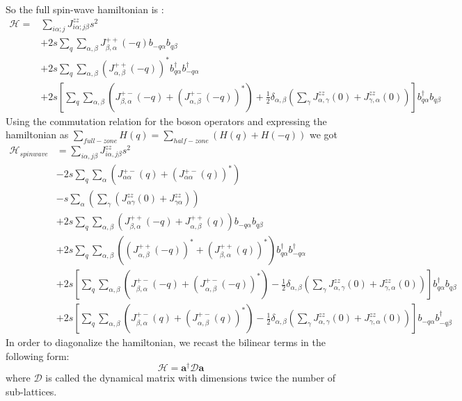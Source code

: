 So the full spin-wave hamiltonian is :
\begin{equation}\label{eq45}
\begin{split}
\mathcal{H} = &\sum_{i\alpha;j}^{}J^{zz}_{i\alpha;j\beta}s^2\\
&+2s\sum_{q}^{}\sum_{\alpha,\beta}^{}J^{++}_{\beta,\alpha}(-q)b_{-q\alpha}b_{q\beta}\\
&+2s\sum_{q}^{}\sum_{\alpha,\beta}^{}(J_{\alpha,\beta}^{++}(-q))^*b^\dagger_{q\alpha}b^\dagger_{-q\alpha}\\
&+2s[\sum_{q}^{}\sum_{\alpha,\beta}^{}(J^{+-}_{\beta,\alpha}(-q) + (J^{+-}_{\alpha,\beta}(-q))^*) + \frac{1}{2}\delta_{\alpha,\beta}(\sum_{\gamma}^{}J^{zz}_{\alpha,\gamma}(0) + J^{zz}_{\gamma,\alpha}(0)) ]b^\dagger_{q\alpha}b_{q\beta}
\end{split}
\end{equation}
Using the commutation relation for the boson operators and expressing the hamiltonian as $ \sum_{full-zone}^{}H(q) = \sum_{half-zone}^{}(H(q) + H(-q)) $ we got
\begin{equation}
	\begin{split}
		\mathcal{H}_{spinwave} &= \sum_{i\alpha,j\beta}^{}J^{zz}_{i\alpha,j\beta}s^2\\
		&-2s\sum_{q}^{}\sum_{\alpha}^{}(J^{+-}_{\alpha \alpha}(q) + (J^{+-}_{\alpha \alpha}(q))^* )\\
		&-s\sum_{\alpha}^{}\left( \sum_{\gamma}^{} (J^{zz}_{\alpha \gamma}(0) + J^{zz}_{\gamma \alpha}) \right)\\
		&+2s\sum_{q}^{}\sum_{\alpha,\beta}^{}\left(J^{++}_{\beta,\alpha}(-q) + J^{++}_{\alpha, \beta}(q) \right)b_{-q\alpha}b_{q\beta}\\
		&+2s\sum_{q}^{}\sum_{\alpha,\beta}^{}\left((J_{\alpha,\beta}^{++}(-q))^* + (J_{\beta,\alpha}^{++}(q))^* \right)b^\dagger_{q\alpha}b^\dagger_{-q\alpha}\\
		&+2s[\sum_{q}^{}\sum_{\alpha,\beta}^{}(J^{+-}_{\beta,\alpha}(-q) + (J^{+-}_{\alpha,\beta}(-q))^*) - \frac{1}{2}\delta_{\alpha,\beta}(\sum_{\gamma}^{}J^{zz}_{\alpha,\gamma}(0) + J^{zz}_{\gamma,\alpha}(0)) ]b^\dagger_{q\alpha}b_{q\beta}\\
		&+2s[\sum_{q}^{}\sum_{\alpha,\beta}^{}(J^{+-}_{\beta,\alpha}(q) + (J^{+-}_{\alpha,\beta}(q))^*) - \frac{1}{2}\delta_{\alpha,\beta}(\sum_{\gamma}^{}J^{zz}_{\alpha,\gamma}(0) + J^{zz}_{\gamma,\alpha}(0)) ]b_{-q\alpha}b^\dagger_{-q\beta}
	\end{split}
\end{equation}
In order to diagonalize the hamiltonian, we recast the bilinear terms in the following form:
\begin{equation}
	\mathcal{H} = \textbf{a}^\dagger\mathcal{D}\textbf{a}
\end{equation}
where $ \mathcal{D} $ is called the dynamical matrix with dimensions twice the number of sub-lattices.

